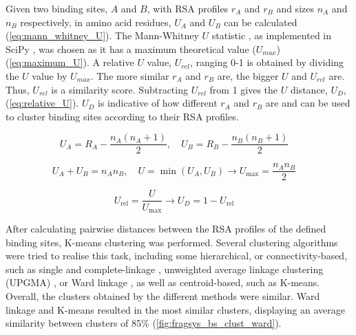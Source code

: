 Given two binding sites, $A$ and $B$, with RSA profiles $r_{A}$ and $r_{B}$ and sizes $n_{A}$ and $n_{B}$ respectively, in amino acid residues, $U_{A}$ and $U_{B}$ can be calculated (\autoref{eq:mann_whitney_U}). The Mann-Whitney $U$ statistic \cite{MANN_WHITNEY_1947_TEST}, as implemented in SciPy \cite{VIRTANEN_2020_SCIPY}, was chosen as it has a maximum theoretical value ($U_{max}$) (\autoref{eq:maximum_U}). A relative $U$ value, $U_{rel}$, ranging 0-1 is obtained by dividing the $U$ value by $U_{max}$. The more similar $r_{A}$ and $r_{B}$ are, the bigger $U$ and $U_{rel}$ are. Thus, $U_{rel}$ is a similarity score. Subtracting $U_{rel}$ from 1 gives the $U$ distance, $U_{D}$, (\autoref{eq:relative_U}). $U_{D}$ is indicative of how different $r_{A}$ and $r_{B}$ are and can be used to cluster binding sites according to their RSA profiles.

\begin{equation}
U_A = R_A - \frac{n_A(n_A + 1)}{2}, \quad U_B = R_B - \frac{n_B(n_B + 1)}{2} \quad
\label{eq:mann_whitney_U}
\end{equation}

\begin{equation}
U_A + U_B = n_A n_B, \quad U = \min(U_A, U_B) \rightarrow U_{\max} = \frac{n_A n_B}{2} \quad
\label{eq:maximum_U} 
\end{equation}

\begin{equation}
U_{\text{rel}} = \frac{U}{U_{\max}} \rightarrow U_D = 1 - U_{\text{rel}} \quad 
\label{eq:relative_U}
\end{equation}

After calculating pairwise distances between the RSA profiles of the defined binding sites, K-means clustering \cite{LLOYD_1982_KMEANS} was performed. Several clustering algorithms were tried to realise this task, including some hierarchical, or connectivity-based, such as single and complete-linkage \cite{SORENSEN_1948_CL}, unweighted average linkage clustering (UPGMA) \cite{SOKAL_1958_UPGMA}, or Ward linkage \cite{WARD_1963_CLUSTERING}, as well as centroid-based, such as K-means. Overall, the clusters obtained by the different methods were similar. Ward linkage and K-means resulted in the most similar clusters, displaying an average similarity between clusters of 85\% (\autoref{fig:fragsys_bs_clust_ward}).

